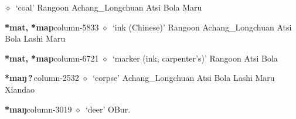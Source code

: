         $\diamond$~`coal'
         Rangoon 
\hspace{1ex}
         Achang\_Longchuan 
\hspace{1ex}
         Atsi 
\hspace{1ex}
         Bola 
\hspace{1ex}
         Maru 
  \item {\footnotesize \textbf{*mat, *map}}{\tiny column-5833}
         $\diamond$~`ink (Chinese)'
         Rangoon 
\hspace{1ex}
         Achang\_Longchuan 
\hspace{1ex}
         Atsi 
\hspace{1ex}
         Bola 
\hspace{1ex}
         Lashi 
\hspace{1ex}
         Maru 
  \item {\footnotesize \textbf{*mat, *map}}{\tiny column-6721}
         $\diamond$~`marker (ink, carpenter's)'
         Rangoon 
\hspace{1ex}
         Atsi 
\hspace{1ex}
         Bola 
  \item {\footnotesize \textbf{*maŋ\,?\,}}{\tiny column-2532}
         $\diamond$~`corpse'
         Achang\_Longchuan 
\hspace{1ex}
         Atsi 
\hspace{1ex}
         Bola 
\hspace{1ex}
         Lashi 
\hspace{1ex}
         Maru 
\hspace{1ex}
         Xiandao 
  \item {\footnotesize \textbf{*maŋ}}{\tiny column-3019}
         $\diamond$~`deer'
         OBur. 
\hspace{1ex}
